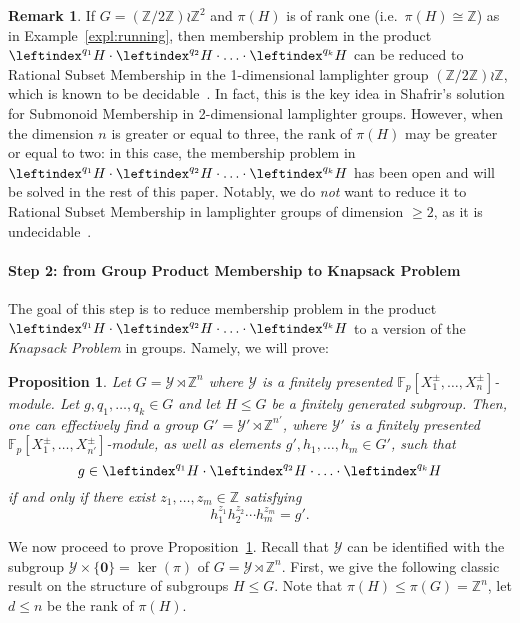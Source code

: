 \documentclass[a4paper,UKenglish,cleveref, autoref, thm-restate]{lipics-v2021}
\newcommand{\Z}{\mathbb{Z}}
\newcommand{\F}{\mathbb{F}}
\newcommand{\mY}{\mathcal{Y}}
\newcommand{\bzer}{\boldsymbol{0}}
\newtheorem{prop}[thrm]{Proposition}
\theoremstyle{definition}
\theoremstyle{definition}
\theoremstyle{definition}
\newtheorem{rmk}[thrm]{Remark}
\begin{document}
\begin{rmk}
If $G = (\Z/2\Z) \wr \Z^2$ and $\pi(H)$ is of rank one (i.e.\ $\pi(H) \cong \Z$) as in Example~\ref{expl:running}, then membership problem in the product $\leftindex^{q_1}{H} \cdot \leftindex^{q_2}{H} \cdot \ldots \cdot \leftindex^{q_{k}}{H}$ can be reduced to Rational Subset Membership in the 1-dimensional lamplighter group $(\Z/2\Z) \wr \Z$, which is known to be decidable~\cite{lohrey2015rational}. In fact, this is the key idea in Shafrir's solution~\cite{potthast2020submonoid} for Submonoid Membership in 2-dimensional lamplighter groups.
However, when the dimension $n$ is greater or equal to three, the rank of $\pi(H)$ may be greater or equal to two: in this case, the membership problem in $\leftindex^{q_1}{H} \cdot \leftindex^{q_2}{H} \cdot \ldots \cdot \leftindex^{q_{k}}{H}$ has been open and will be solved in the rest of this paper.
Notably, we do \emph{not} want to reduce it to Rational Subset Membership in lamplighter groups of dimension $\geq 2$, as it is undecidable~\cite{lohrey2011tilings}.
\end{rmk}

\paragraph*{Step 2: from Group Product Membership to Knapsack Problem}
The goal of this step is to reduce membership problem in the product $\leftindex^{q_1}{H} \cdot \leftindex^{q_2}{H} \cdot \ldots \cdot \leftindex^{q_{k}}{H}$ to a version of the \emph{Knapsack Problem} in groups.
Namely, we will prove:
\begin{prop}\label{prop:GPtoKP}
    Let $G = \mY \rtimes \Z^n$ where $\mY$ is a finitely presented $\F_p[X_1^{\pm}, \ldots, X_{n}^{\pm}]$-module.
    Let $g, q_1, \ldots, q_k \in G$ and let $H \leq G$ be a finitely generated subgroup.
    Then, one can effectively find a group $G' = \mY' \rtimes \Z^{n'}$, where $\mY'$ is a finitely presented $\F_p[X_1^{\pm}, \ldots, X_{n'}^{\pm}]$-module, as well as elements $g', h_1, \ldots, h_m \in G'$, such that
    \[
    g \in \leftindex^{q_1}{H} \cdot \leftindex^{q_2}{H} \cdot \ldots \cdot \leftindex^{q_{k}}{H}
    \]
    if and only if there exist $z_1, \ldots, z_m \in \Z$ satisfying
    \begin{equation}\label{eq:KP2}
        h_1^{z_1} h_2^{z_2} \cdots h_m^{z_m} = g'.
    \end{equation}
\end{prop}

We now proceed to prove Proposition~\ref{prop:GPtoKP}.
Recall that $\mY$ can be identified with the subgroup $\mY \times \{\bzer\} = \ker(\pi)$ of $G = \mY \rtimes \Z^n$. 
First, we give the following classic result on the structure of subgroups $H \leq G$.
Note that $\pi(H) \leq \pi(G) = \Z^n$, let $d \leq n$ be the rank of $\pi(H)$.
\end{document}

